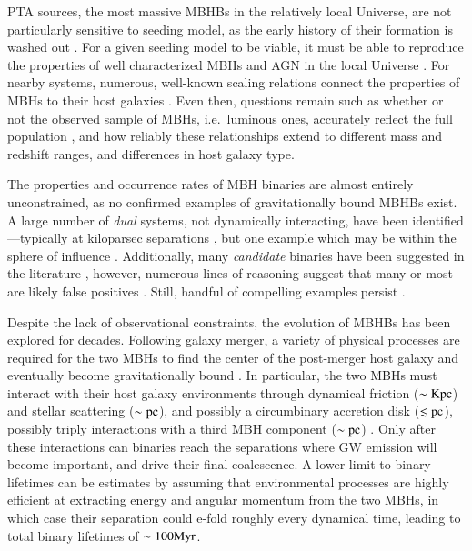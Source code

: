 \documentclass[useAMS, usenatbib]{mnras}
\begin{document}
    PTA sources, the most massive MBHBs in the relatively local Universe, are not particularly sensitive to seeding model, as the early history of their formation is washed out \needcite{}.  For a given seeding model to be viable, it must be able to reproduce the properties of well characterized MBHs and AGN in the local Universe \needcite{}.  For nearby systems, numerous, well-known scaling relations connect the properties of MBHs to their host galaxies .  Even then, questions remain such as whether or not the observed sample of MBHs, i.e.~luminous ones, accurately reflect the full population , and how reliably these relationships extend to different mass and redshift ranges, and differences in host galaxy type.

    The properties and occurrence rates of MBH binaries are almost entirely unconstrained, as no confirmed examples of gravitationally bound MBHBs exist.  A large number of \textit{dual} systems, not dynamically interacting, have been identified---typically at kiloparsec separations , but one example which may be within the sphere of influence .  Additionally, many \textit{candidate} binaries have been suggested in the literature , however, numerous lines of reasoning suggest that many or most are likely false positives .  Still, handful of compelling examples persist .

    Despite the lack of observational constraints, the evolution of MBHBs has been explored for decades.  Following galaxy merger, a variety of physical processes are required for the two MBHs to find the center of the post-merger host galaxy and eventually become gravitationally bound .  In particular, the two MBHs must interact with their host galaxy environments through dynamical friction ($\sim\mathrm{Kpc}$) and stellar scattering ($\sim \mathrm{pc}$), and possibly a circumbinary accretion disk ($\lesssim \mathrm{pc}$), possibly triply interactions with a third MBH component ($\sim \mathrm{pc}$) .  Only after these interactions can binaries reach the separations where GW emission will become important, and drive their final coalescence.  A lower-limit to binary lifetimes can be estimates by assuming that environmental processes are highly efficient at extracting energy and angular momentum from the two MBHs, in which case their separation could e-fold roughly every dynamical time, leading to total binary lifetimes of $\sim 100 \mathrm{Myr}$.
\end{document}
